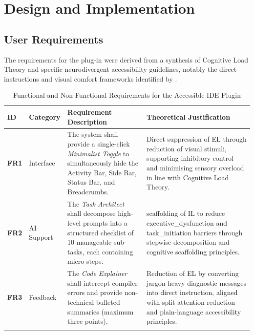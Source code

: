 \section{Design and Implementation}
\subsection{User Requirements} 
The requirements for the plug-in were derived from a synthesis of Cognitive Load Theory and specific \gls{neurodivergent} accessibility guidelines, notably the direct 
instructions and visual comfort frameworks identified by \textcite{rocha2025conceptual}.

\begin{table}[H]
    \centering
    \caption{Functional and Non-Functional Requirements for the Accessible \gls{IDE} Plugin}\label{tab:requirements}
    \small
    \begin{tabularx}{\textwidth}{@{} l l X X @{}}
        \toprule
        \textbf{ID} & \textbf{Category} & \textbf{Requirement Description} & \textbf{Theoretical Justification} \\ 
        \midrule
        
        \textbf{FR1} & Interface &
        The system shall provide a single-click \textit{Minimalist Toggle} to simultaneously hide the Activity Bar, Side Bar, Status Bar, and Breadcrumbs. &
        Direct suppression of \gls{EL} through reduction of visual stimuli, supporting inhibitory control and minimising sensory overload in line with Cognitive Load Theory. \\ 
        \addlinespace
        
        \textbf{FR2} & \gls{AI} Support &
        The \textit{Task Architect} shall decompose high-level prompts into a structured checklist of 10 manageable sub-tasks, each containing micro-steps. &
        \Gls{scaffolding} of \gls{IL} to reduce \gls{executive_dysfunction} and \gls{task_initiation} barriers through stepwise decomposition and cognitive \gls{scaffolding} principles. \\ 
        \addlinespace
        
        \textbf{FR3} & Feedback &
        The \textit{Code Explainer} shall intercept compiler errors and provide non-technical bulleted summaries (maximum three points). &
        Reduction of \gls{EL} by converting jargon-heavy diagnostic messages into direct instruction, aligned with split-attention reduction and plain-language accessibility principles. \\ 
        \addlinespace
        

\end{tabularx}
\end{table}
